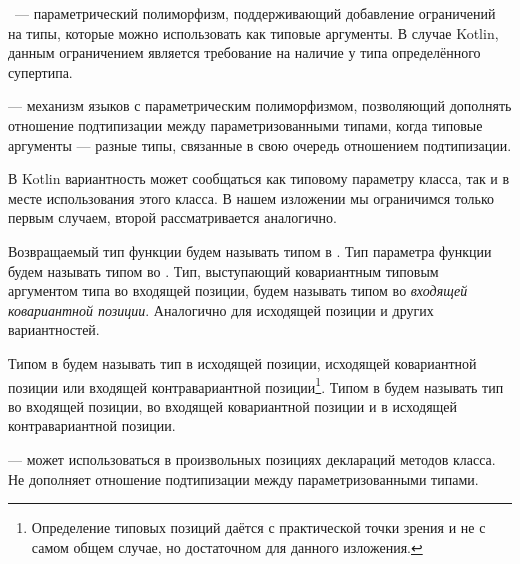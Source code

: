 \begin{definition}
    ~--- параметрический полиморфизм, поддерживающий добавление ограничений на типы, которые можно использовать как типовые аргументы.
    В случае Kotlin, данным ограничением является требование на наличие у типа определённого супертипа.
\end{definition}

\begin{definition}
    \label{def:variance}
     --- механизм языков с параметрическим полиморфизмом, позволяющий дополнять отношение подтипизации между параметризованными типами, когда типовые аргументы --- разные типы, связанные в свою очередь отношением подтипизации.
\end{definition}

В Kotlin вариантность может сообщаться как типовому параметру класса, так и в месте использования этого класса.
В нашем изложении мы ограничимся только первым случаем, второй рассматривается аналогично.

\begin{definition}
    \label{def:type-positions}
    Возвращаемый тип функции будем называть типом в .
    Тип параметра функции будем называть типом во .
    Тип, выступающий ковариантным типовым аргументом типа во входящей позиции, будем называть типом во \emph{входящей ковариантной позиции}.
    Аналогично для исходящей позиции и других вариантностей.
\end{definition}

\begin{definition}
    \label{def:type-position-sign}
    Типом в  будем называть тип в исходящей позиции, исходящей ковариантной позиции или входящей контравариантной позиции\footnote{Определение типовых позиций даётся с практической точки зрения и не с самом общем случае, но достаточном для данного изложения.}.
    Типом в  будем называть тип во входящей позиции, во входящей ковариантной позиции и в исходящей контравариантной позиции.
\end{definition}

\begin{definition}
    \label{def:invariant}
     --- может использоваться в произвольных позициях деклараций методов класса.
    Не дополняет отношение подтипизации между параметризованными типами.
\end{definition}

